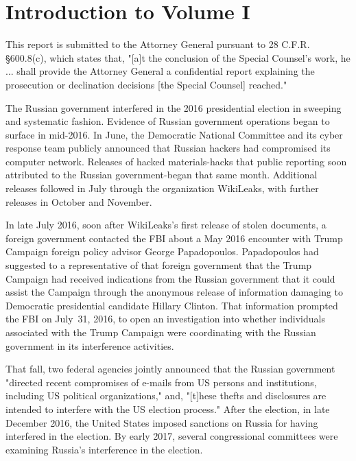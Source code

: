 \section*{Introduction to Volume I}
\label{sec:introduction-1}

This report is submitted to the Attorney General pursuant to 28 C.F.R. \S 600.8(c), which states that, "[a]t the conclusion of the Special Counsel's work, he ... shall provide the Attorney General a confidential report explaining the prosecution or declination decisions [the Special Counsel] reached."

The Russian government interfered in the 2016 presidential election in sweeping and systematic fashion.
Evidence of Russian government operations began to surface in mid-2016.
In June, the Democratic National Committee and its cyber response team publicly announced that Russian hackers had compromised its computer network. Releases of hacked materials-hacks that public reporting soon attributed to the Russian government-began that same month.
Additional releases followed in July through the organization WikiLeaks, with further releases in October and November.

In late July 2016, soon after WikiLeaks's first release of stolen documents, a foreign government contacted the FBI about a May 2016 encounter with Trump Campaign foreign policy advisor George Papadopoulos.
Papadopoulos had suggested to a representative of that foreign government that the Trump Campaign had received indications from the Russian government that it could assist the Campaign through the anonymous release of information damaging to Democratic presidential candidate Hillary Clinton.
That information prompted the FBI on July~31, 2016, to open an investigation into whether individuals associated with the Trump Campaign were coordinating with the Russian government in its interference activities.

That fall, two federal agencies jointly announced that the Russian government "directed recent compromises of e-mails from US persons and institutions, including US political organizations," and, "[t]hese thefts and disclosures are intended to interfere with the US election process."
After the election, in late December 2016, the United States imposed sanctions on Russia for having interfered in the election. By early 2017, several congressional committees were examining Russia's interference in the election.

